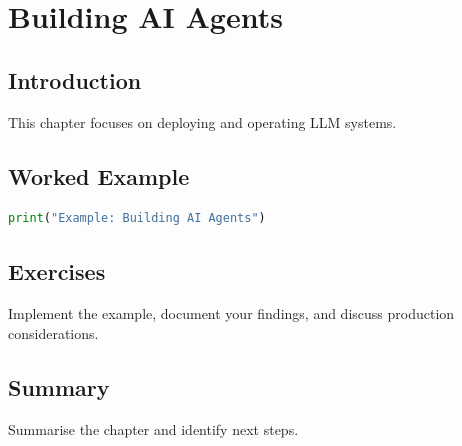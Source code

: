 \chapter{Building AI Agents}
\label{chap:vol9-17}



\section{Introduction}
This chapter focuses on deploying and operating LLM systems.

\section{Worked Example}
\begin{lstlisting}[language=Python]
print("Example: Building AI Agents")
\end{lstlisting}

\section{Exercises}
\begin{exercise}
Implement the example, document your findings, and discuss production considerations.
\end{exercise}

\section{Summary}
Summarise the chapter and identify next steps.
